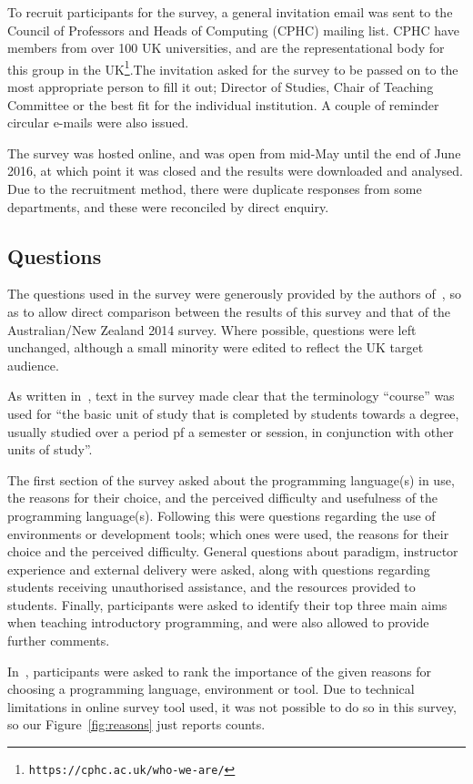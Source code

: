 \documentclass{sig-alternate}
\begin{document}
To recruit participants for the survey, a general invitation email was sent to the Council of Professors and Heads of Computing (CPHC) mailing list. CPHC have members from over 100 UK universities, and are the representational body for this group in the UK\footnote{\texttt{https://cphc.ac.uk/who-we-are/}}.The invitation asked for the survey to be passed on to the most appropriate person to fill it out; Director of Studies, Chair of Teaching Committee or the best fit for the individual institution. A couple of reminder circular e-mails were also issued.

The survey was hosted online, and was open from mid-May until the end of June 2016, at which point it was closed and the results were downloaded and analysed. Due to the recruitment method, there were duplicate responses from some departments, and these were reconciled by direct enquiry.
\subsection{Questions}

The questions used in the survey were generously provided by the authors of~\cite{mason+cooper:2014}, so as to allow direct comparison between the results of this survey and that of the Australian/New Zealand 2014 survey. Where possible, questions were left unchanged, although a small minority were edited to reflect the UK target audience. 

As written in~\cite{mason+cooper:2014}, text in the survey made clear that the terminology ``course'' was used for ``the basic unit of study that is completed by students towards a degree, usually studied over a period pf a semester or session, in conjunction with other units of study''. 

The first section of the survey asked about the programming language(s) in use, the reasons for their choice, and the perceived difficulty and usefulness of the programming language(s). Following this were questions regarding the use of environments or development tools; which ones were used, the reasons for their choice and the perceived difficulty. General questions about paradigm, instructor experience and external delivery were asked, along with questions regarding students receiving unauthorised assistance, and the resources provided to students. Finally, participants were asked to identify their top three main aims when teaching introductory programming, and were also allowed to provide further comments. 

In~\cite{mason+cooper:2014}, participants were asked to rank the importance of the given reasons for choosing a programming language, environment or tool. Due to technical limitations in online survey tool used, it was not possible to do so in this survey, so our Figure~\ref{fig:reasons} just reports counts.
\end{document}
